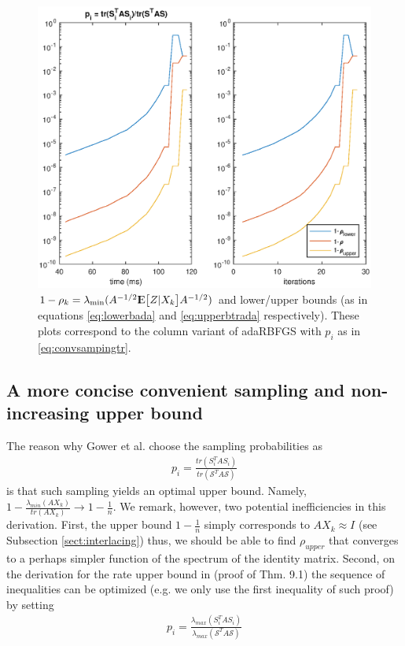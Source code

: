 \documentclass[12pt,conference,compsocconf]{IEEEtran}
\newcommand{\E}{{\rm I\kern-.3em E}}
\begin{document}
\begin{figure}[H]
  \centering
  \includegraphics[height=0.7\columnwidth,width=1.1\columnwidth]{ratetr.eps}
  
  \vspace{-2mm}
  \caption{$1-\rho_k=\lambda_{\text{min}}(A^{-1/2}\E\big[Z|X_k\big]A^{-1/2})$ and lower/upper bounds (as in equations \ref{eq:lowerbada} and \ref{eq:upperbtrada} respectively). These plots correspond to the column variant of adaRBFGS with $p_i$ as in \ref{eq:convsampingtr}. \label{fig:ratetr}}
  
\end{figure}

\subsection{A more concise convenient sampling and non-increasing upper bound}\label{sect:convsampling}
The reason why Gower et al. choose the sampling probabilities as 
\begin{align}\label{eq:convsampingtr}
	p_i=\frac{tr(S_i^TAS_i)}{tr(\mathcal{S}^TA\mathcal{S})}
\end{align}
is that such sampling yields an optimal upper bound. Namely, $1-\frac{\lambda_{min}(AX_k)}{tr(AX_k)} \rightarrow 1-\frac{1}{n}$. We remark, however, two potential inefficiencies in this derivation. First, the upper bound $1-\frac{1}{n}$ simply corresponds to $AX_k\approx I$ (see Subsection \ref{sect:interlacing}) thus, we should be able to find $\rho_{upper}$ that converges to a perhaps simpler function of the spectrum of the identity matrix. Second, on the derivation for the rate upper bound in \cite{Gower1} (proof of Thm. 9.1) the sequence of inequalities can be optimized (e.g. we only use the first inequality of such proof) by setting
\begin{align}\label{eq:convsamplingmax}
	p_i=\frac{\lambda_{max}(S_i^TAS_i)}{\lambda_{max}(\mathcal{S}^TA\mathcal{S})}
\end{align}
\end{document}
